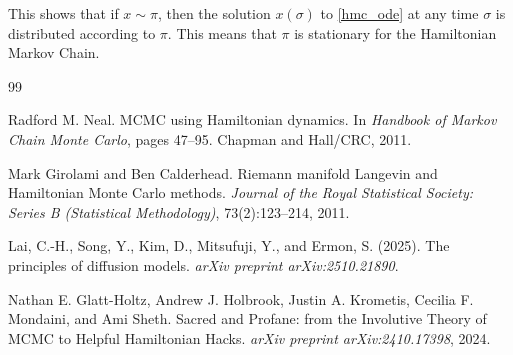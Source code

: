 \documentclass{scrartcl}
\begin{document}
This shows that if $x \sim \pi$, then the solution $x(\sigma)$ to
\eqref{hmc_ode} at any time $\sigma$ is distributed according to
$\pi$. This means that $\pi$ is stationary for the Hamiltonian Markov
Chain. 




\begin{thebibliography}{99}

Radford M. Neal.
\newblock MCMC using Hamiltonian dynamics.
\newblock In \emph{Handbook of Markov Chain Monte Carlo}, pages 47--95.
\newblock Chapman and Hall/CRC, 2011.

Mark Girolami and Ben Calderhead.
\newblock Riemann manifold Langevin and Hamiltonian Monte Carlo methods.
\newblock \emph{Journal of the Royal Statistical Society: Series B (Statistical Methodology)}, 73(2):123--214, 2011.

Lai, C.-H., Song, Y., Kim, D., Mitsufuji, Y., and Ermon, S. (2025).
\newblock The principles of diffusion models.
\newblock \emph{arXiv preprint arXiv:2510.21890}.

Nathan E. Glatt-Holtz, Andrew J. Holbrook, Justin A. Krometis, Cecilia F. Mondaini, and Ami Sheth.
\newblock Sacred and Profane: from the Involutive Theory of MCMC to Helpful Hamiltonian Hacks.
\newblock \emph{arXiv preprint arXiv:2410.17398}, 2024.




  




\end{thebibliography}
\end{document}
